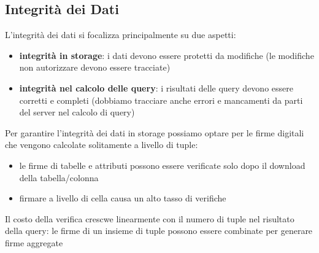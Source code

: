 \subsection{Integrità dei Dati}
L'integrità dei dati si focalizza principalmente su due aspetti:
\begin{itemize}
    \item \textbf{integrità in storage}: i dati devono essere protetti da modifiche (le modifiche non autorizzare devono essere tracciate)
    \item \textbf{integrità nel calcolo delle query}: i risultati delle query devono essere corretti e completi (dobbiamo tracciare anche errori e mancamenti da parti del server nel calcolo di query)
\end{itemize}
Per garantire l'integrità dei dati in storage possiamo optare per le firme digitali che vengono calcolate solitamente a livello di tuple:
\begin{itemize}
    \item le firme di tabelle e attributi possono essere verificate solo dopo il download della tabella/colonna
    \item firmare a livello di cella causa un alto tasso di verifiche
\end{itemize}
Il costo della verifica crescwe linearmente con il numero di tuple nel risultato della query: le firme di un insieme di tuple possono essere combinate per generare firme aggregate

